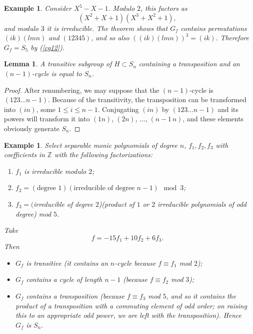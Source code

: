\documentclass[a4paper,11pt,final,openany]{memoir}
\newtheorem{lemma}[X]{Lemma}
\newtheorem{example}[X]{Example}
\theoremstyle{nonumberplain}
\newtheorem{proof}{Proof.}
\begin{document}
\begin{example}
\label{cg22}Consider $X^{5}-X-1$. Modulo $2$, this factors as
\[
(X^{2}+X+1)(X^{3}+X^{2}+1),
\]
and modulo $3$ it is irreducible. The theorem shows that $G_{f}$ contains
permutations $(ik)(lmn)$ and $(12345)$, and so also $((ik)(lmn))^{3}=(ik)$.
Therefore $G_{f}=S_{5}$ by (\ref{cg12}).
\end{example}

\begin{lemma}
\label{cg23}A transitive subgroup of $H\subset S_{n}$ containing a
transposition and an $(n-1)$-cycle is equal to $S_{n}$.
\end{lemma}

\begin{proof}
After renumbering, we may suppose that the $(n-1)$-cycle is $(123\ldots n-1)$.
Because of the transitivity, the transposition can be transformed into $(in)$,
some $1\leq i\leq n-1$. Conjugating $(in)$ by $(123\ldots n-1)$ and its powers
will transform it into $(1n)$, $(2n)$, $\ldots$, $(n-1\,n)$, and these
elements obviously generate $S_{n}.$
\end{proof}

\begin{example}
\label{cg24}Select separable monic polynomials of degree $n$, $f_{1}%
,f_{2},f_{3}$ with coefficients in $\mathbb{Z}$ with the following factorizations:

\begin{enumerate}
\item $f_{1}$ is irreducible modulo $2$;

\item $f_{2}=(\text{degree }1)(\text{irreducible of degree }n-1)\mod3$;

\item $f_{3}=($irreducible of degree $2$)(product of $1$ or $2$ irreducible
polynomials of odd degree) mod $5$.
\end{enumerate}

\noindent Take
\[
f=-15f_{1}+10f_{2}+6f_{3}.
\]
Then

\begin{itemize}
\item[(i)] $G_{f}$ is transitive (it contains an $n$-cycle because $f\equiv
f_{1}$ mod $2$);

\item[(ii)] $G_{f}$ contains a cycle of length $n-1$ (because $f\equiv f_{2}$
mod $3$);

\item[(iii)] $G_{f}$ contains a transposition (because $f\equiv f_{3}$ mod $5
$, and so it contains the product of a transposition with a commuting element
of odd order; on raising this to an appropriate odd power, we are left with
the transposition). Hence $G_{f}$ is $S_{n}.$
\end{itemize}
\end{example}
\end{document}
